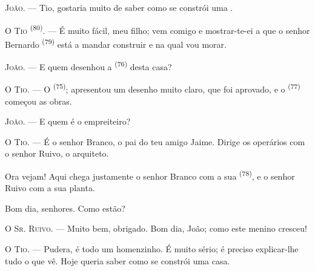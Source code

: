 %
%

\VUsaut{6.0mm}
\VUsaut{1.4mm}
\VUsaut{2.2mm}

\VUsaut{3.0mm}

\textsc{João}. --- Tio, gostaria muito de saber como se constrói uma
.

\textsc{O Tio} \textsuperscript{(80)}. --- É muito fácil, meu filho; vem comigo
e mostrar-te-ei a que o senhor Bernardo \textsuperscript{(79)} está a mandar
construir e na qual vou morar.

\textsc{João}. --- E quem desenhou a  \textsuperscript{(76)} desta
casa?

\textsc{O Tio}. --- O  \textsuperscript{(75)}; apresentou um
desenho muito claro, que foi aprovado, e o 
\textsuperscript{(77)} começou as obras.

\textsc{João}. --- E quem é o empreiteiro?

\textsc{O Tio}. --- É o senhor Branco, o pai do teu amigo Jaime. Dirige os
operários com o senhor Ruivo, o arquiteto.

Ora vejam! Aqui chega justamente o senhor Branco com a sua 
\textsuperscript{(78)}, e o senhor Ruivo com a sua planta.

Bom dia, senhores. Como estão?

\textsc{O Sr. Ruivo}. --- Muito bem, obrigado. Bom dia, João; como este
menino cresceu!

\textsc{O Tio}. --- Pudera, é todo um homenzinho. É muito sério; é preciso
explicar-lhe tudo o que vê. Hoje queria saber como se constrói uma casa.

